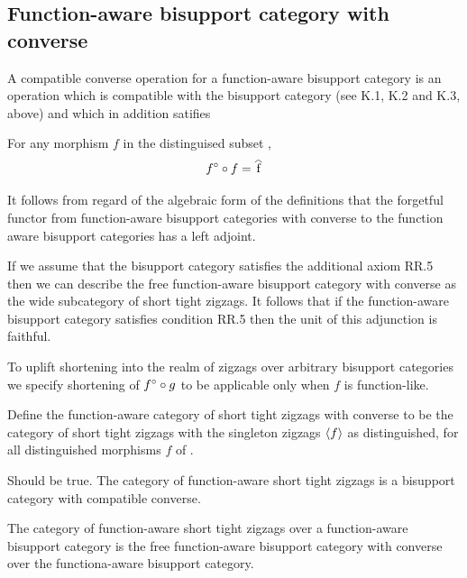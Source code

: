 \subsection{Function-aware bisupport category with converse}

\begin{definition} 
A compatible converse operation for a function-aware bisupport category \catcw is
an operation \converseItself which is compatible with the bisupport
category \catcw (see K.1, K.2 and K.3, above)
and which in addition satifies 

\noindent [K.5]\quad
For any morphism $f$ in the distinguised subset \catd,
\[
\converse{f} \circ f = \rng{f}
\]
\end{definition}

It follows from regard of the algebraic form of the definitions that 
the forgetful functor from function-aware bisupport categories with converse to the function aware bisupport categories has a left adjoint.

If we assume that the bisupport category satisfies the additional axiom RR.5 then we can describe the free function-aware bisupport category with converse as the wide subcategory of short tight zigzags. It follows that if the function-aware bisupport category satisfies condition RR.5 then the unit of this adjunction is faithful. 

\begin{aside}
To uplift shortening into the realm of zigzags over arbitrary bisupport
categories we specify shortening of ${f}^\circ \circ g$ to be applicable only when $f$ is function-like.
\end{aside}

Define the function-aware category of short tight zigzags with 
converse to be the category of short tight zigzags with the
singleton zigzags $\langle f\rangle$ as distinguished, for all distinguished morphisms $f$ of \catd.  

\begin{lemma}{Should be true.}
The category of function-aware short tight zigzags is a bisupport category with compatible converse.
\end{lemma}

\begin{lemma}
The category of function-aware short tight zigzags over a 
function-aware bisupport category \catcw is the 
free function-aware bisupport category with converse over 
the functiona-aware bisupport category\catc. 
\end{lemma}

